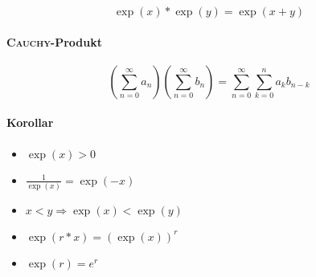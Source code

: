 \begin{mzImportant}
  $$\exp(x) * \exp(y) = \exp(x + y)$$
\end{mzImportant}

\paragraph{\textsc{Cauchy}-Produkt}

\begin{mzImportant}
  $$(\sum_{n = 0}^\infty a_n)(\sum_{n = 0}^\infty b_n) = \sum_{n = 0}^\infty \sum_{k = 0}^n a_k b_{n - k}$$
\end{mzImportant}

\paragraph{Korollar}

\begin{itemize}
  \item $\exp (x) > 0$
  \item $\frac{1}{\exp (x)} = \exp (-x)$
  \item $x < y \Rightarrow \exp (x) < \exp (y)$
  \item $\exp(r * x) = (\exp (x))^r$
  \item $\exp(r) = e^r$
\end{itemize}